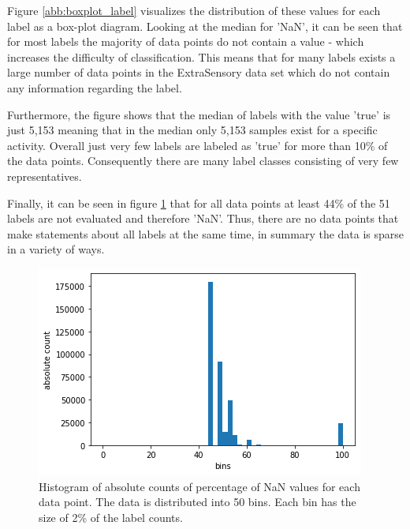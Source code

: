 Figure \ref{abb:boxplot_label} visualizes the distribution of these values for each label as a box-plot diagram. Looking at the median for 'NaN', it can be seen that for most labels the majority of data points do not contain a value - which increases the difficulty of classification. This means that for many labels exists a large number of data points in the ExtraSensory data set which do not contain any information regarding the label.

Furthermore, the figure shows that the median of labels with the value 'true' is just 5,153 meaning that in the median only 5,153 samples exist for a specific activity. Overall just very few labels are labeled as 'true' for more than 10\% of the data points. Consequently there are many label classes consisting of very few representatives. 

Finally, it can be seen in figure \ref{abb:histogramm_data} that for all data points at least 44\% of the 51 labels are not evaluated and therefore 'NaN'. Thus, there are no data points that make statements about all labels at the same time, in summary the data is sparse in a variety of ways.

\begin{figure}[H]
	\begin{center}
		\includegraphics[scale=.8]{images/hist.png}
		\caption{Histogram of absolute counts of percentage of NaN values for each data point. The data is distributed into 50 bins. Each bin has the size of 2\% of the label counts.}
		\label{abb:histogramm_data}
	\end{center}		
\end{figure}